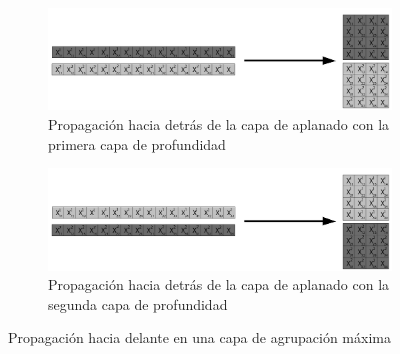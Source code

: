 \begin{figure}[H]
	\centering
	\begin{subfigure}{.5\textwidth}
		\hspace{-30mm}
		\includegraphics[width=2\linewidth]{imagenes/back_flatten_1.jpg}  
		\caption{Propagación hacia detrás de la capa de aplanado con la primera capa de profundidad}
	\end{subfigure}
	\begin{subfigure}{.5\textwidth}
		\hspace{-30mm}
		\includegraphics[width=2\linewidth]{imagenes/back_flatten_2.jpg}  
		\caption{Propagación hacia detrás de la capa de aplanado con la segunda capa de profundidad}
	\end{subfigure}
	
	\caption{Propagación hacia delante en una capa de agrupación máxima}
	\label{fig:back_prop_flatten_canales_profundidad}
\end{figure}

\cite{flatten_forward}
